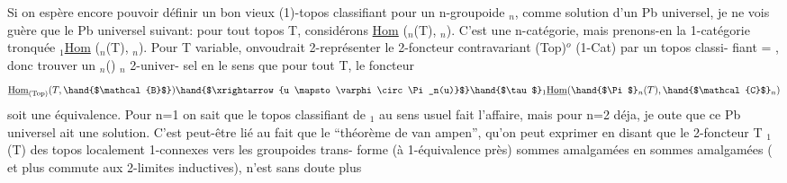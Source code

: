 Si on espère encore pouvoir définir un bon vieux (1)-topos classifiant
pour un n-groupoide $_n$, comme solution d'un Pb universel, je ne vois
guère que le Pb universel suivant: pour tout topos T, considérons
\underline{Hom} (\hand{$\Pi$}$_n$(T), $_n$). C'est une n-catégorie, mais prenons-en la 1-catégorie
tronquée \hand{$\tau$}$_1$\underline{Hom} (\hand{$\Pi$}$_n$(T), $_n$). Pour T variable, on\hand{/}voudrait 2-représenter
le 2-foncteur contravariant (Top)$^{o}$ \hand{$\longrightarrow$} (1-Cat) par un topos classi-%
fiant  =  , donc trouver un \hand{$\Pi$}$_n$() \hand{$\xrightarrow{\varphi}$} $_n$ 2-univer-%
sel en le sens que pour tout T, le foncteur
\[ \underline{\mathrm{Hom}}_{(\mathrm{Top})}(T , \hand{$\mathcal{B}$} ) \hand{$\xrightarrow{u \mapsto \varphi \circ \Pi_n(u)}$} \hand{$\tau$}_1\underline{\mathrm{Hom}} (\hand{$\Pi$}_n(T), \hand{$\mathcal{C}$}_n) \]
soit une équivalence. Pour n=1 on sait que le topos classifiant de $_1$
au sens usuel fait l'affaire, mais pour n=2 déja, je oute que ce Pb
universel ait une solution. C'est peut-être lié au fait que le
``théorème de van ampen'', qu'on peut exprimer en disant que le 2-foncteur
T \hand{$\longrightarrow\Pi$}$_1$(T) des topos localement 1-connexes vers les groupoides trans-%
forme (à 1-équivalence près) sommes amalgamées en sommes amalgamées ( et
plus  commute aux 2-limites inductives), n'est sans doute plus

